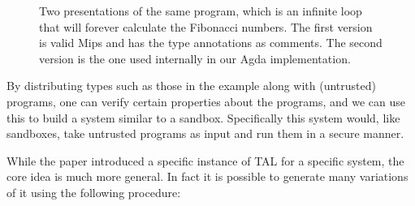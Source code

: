 \begin{figure}
\begin{code}
\end{code}
\caption{Two presentations of the same program, which is an infinite loop that
    will forever calculate the Fibonacci numbers. The first version is valid Mips
    and has the type annotations as comments. The second version is the one used
    internally in our Agda implementation.}
  \label{fig:example}
\end{figure}

By distributing types such as those in the example along with (untrusted)
programs, one can verify certain properties about the programs, and we can use
this to build a system similar to a sandbox. Specifically this system would,
like sandboxes, take untrusted programs as input and run them in a secure
manner.

While the paper introduced a specific instance of TAL for a specific system, the
core idea is much more general. In fact it is possible to generate many
variations of it using the following procedure:

